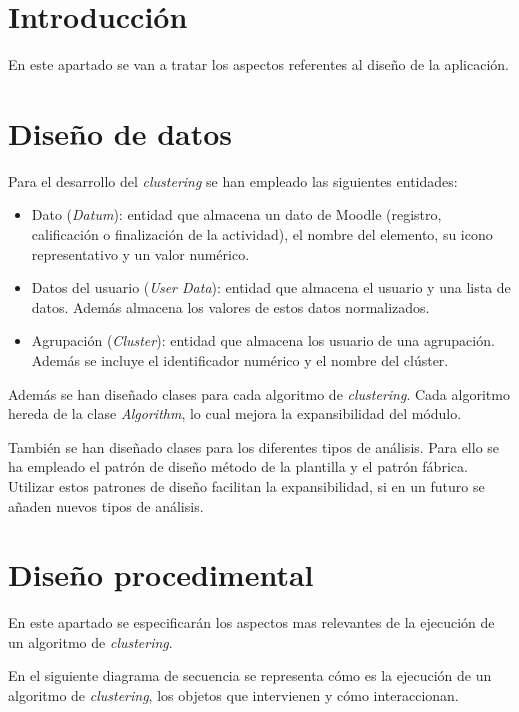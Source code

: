 
\section{Introducción}
En este apartado se van a tratar los aspectos referentes al diseño de la aplicación.
\section{Diseño de datos}
Para el desarrollo del \emph{clustering} se han empleado las siguientes entidades:
\begin{itemize}
	\item Dato (\emph{Datum}): entidad que almacena un dato de Moodle (registro, calificación o finalización de la actividad), el nombre del elemento, su icono representativo y un valor numérico.
	\item Datos del usuario (\emph{User Data}): entidad que almacena el usuario y una lista de datos. Además almacena los valores de estos datos normalizados.
	\item Agrupación (\emph{Cluster}): entidad que almacena los usuario de una agrupación. Además se incluye el identificador numérico y el nombre del clúster.
\end{itemize}

Además se han diseñado clases para cada algoritmo de \emph{clustering}. Cada algoritmo hereda de la clase \emph{Algorithm}, lo cual mejora la expansibilidad del módulo.

También se han diseñado clases para los diferentes tipos de análisis. Para ello se ha empleado el patrón de diseño método de la plantilla y el patrón fábrica. Utilizar estos patrones de diseño facilitan la expansibilidad, si en un futuro se añaden nuevos tipos de análisis.

\section{Diseño procedimental}
En este apartado se especificarán los aspectos mas relevantes de la ejecución de un algoritmo de \emph{clustering}.

En el siguiente diagrama de secuencia se representa cómo es la ejecución de un algoritmo de \emph{clustering}, los objetos que intervienen y cómo interaccionan.

